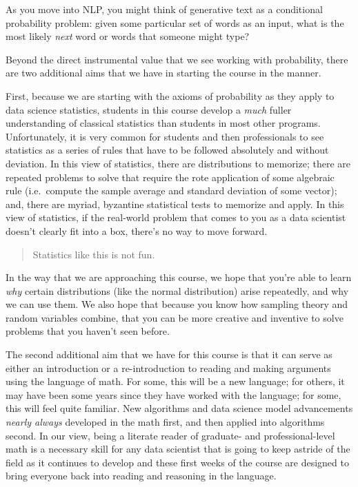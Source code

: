 \documentclass[
  letterpaper,
  DIV=11,
  numbers=noendperiod]{scrreprt}
\begin{document}
As you move into NLP, you might think of generative text as a
conditional probability problem: given some particular set of words as
an input, what is the most likely \emph{next} word or words that someone
might type?

Beyond the direct instrumental value that we see working with
probability, there are two additional aims that we have in starting the
course in the manner.

First, because we are starting with the axioms of probability as they
apply to data science statistics, students in this course develop a
\emph{much} fuller understanding of classical statistics than students
in most other programs. Unfortunately, it is very common for students
and then professionals to see statistics as a series of rules that have
to be followed absolutely and without deviation. In this view of
statistics, there are distributions to memorize; there are repeated
problems to solve that require the rote application of some algebraic
rule (i.e.~compute the sample average and standard deviation of some
vector); and, there are myriad, byzantine statistical tests to memorize
and apply. In this view of statistics, if the real-world problem that
comes to you as a data scientist doesn't clearly fit into a box, there's
no way to move forward.

\begin{quote}
Statistics like this is not fun.
\end{quote}

In the way that we are approaching this course, we hope that you're able
to learn \emph{why} certain distributions (like the normal distribution)
arise repeatedly, and why we can use them. We also hope that because you
know how sampling theory and random variables combine, that you can be
more creative and inventive to solve problems that you haven't seen
before.

The second additional aim that we have for this course is that it can
serve as either an introduction or a re-introduction to reading and
making arguments using the language of math. For some, this will be a
new language; for others, it may have been some years since they have
worked with the language; for some, this will feel quite familiar. New
algorithms and data science model advancements \emph{nearly always}
developed in the math first, and then applied into algorithms second. In
our view, being a literate reader of graduate- and professional-level
math is a necessary skill for any data scientist that is going to keep
astride of the field as it continues to develop and these first weeks of
the course are designed to bring everyone back into reading and
reasoning in the language.
\end{document}
